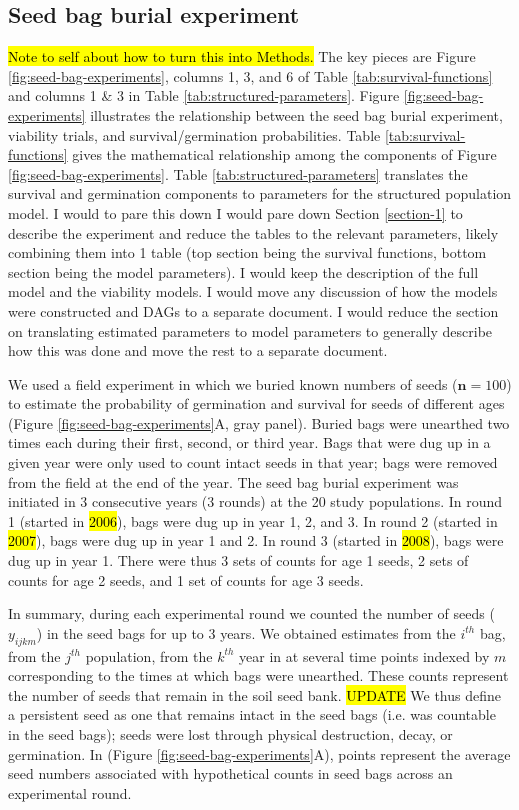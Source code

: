 \documentclass[12pt, oneside, titlepage]{article}   	%
\begin{document}
\subsection{Seed bag burial experiment}

\hl{Note to self about how to turn this into Methods.} The key pieces are Figure \ref{fig:seed-bag-experiments}, columns 1, 3, and 6 of Table \ref{tab:survival-functions} and columns 1 \& 3 in Table \ref{tab:structured-parameters}. Figure \ref{fig:seed-bag-experiments} illustrates the relationship between the seed bag burial experiment, viability trials, and survival/germination probabilities. Table \ref{tab:survival-functions} gives the mathematical relationship among the components of Figure \ref{fig:seed-bag-experiments}. Table \ref{tab:structured-parameters} translates the survival and germination components to parameters for the structured population model. I would to pare this down I would pare down Section \ref{section-1} to describe the experiment and reduce the tables to the relevant parameters, likely combining them into 1 table (top section being the survival functions, bottom section being the model parameters). I would keep the description of the full model and the viability models. I would move any discussion of how the models were constructed and DAGs to a separate document. I would reduce the section on translating estimated parameters to model parameters to generally describe how this was done and move the rest to a separate document. 

We used a field experiment in which we buried known numbers of seeds ($\bm{n}=100$) to estimate the probability of germination and survival for seeds of different ages (Figure \ref{fig:seed-bag-experiments}A, gray panel). Buried bags were unearthed two times each during their first, second, or third year. Bags that were dug up in a given year were only used to count intact seeds in that year; bags were removed from the field at the end of the year. The seed bag burial experiment was initiated in 3 consecutive years (3 rounds) at the 20 study populations. In round 1 (started in \hl{2006}), bags were dug up in year 1, 2, and 3. In round 2 (started in \hl{2007}), bags were dug up in year 1 and 2. In round 3 (started in \hl{2008}), bags were dug up in year 1. There were thus 3 sets of counts for age 1 seeds, 2 sets of counts for age 2 seeds, and 1 set of counts for age 3 seeds. 

In summary, during each experimental round we counted the number of seeds ($y_{ijkm}$) in the seed bags for up to 3 years. We obtained estimates from the $i^{th}$ bag, from the $j^{th}$ population, from the $k^{th}$ year in at several time points indexed by $m$ corresponding to the times at which bags were unearthed. These counts represent the number of seeds that remain in the soil seed bank. \hl{UPDATE} We thus define a persistent seed as one that remains intact in the seed bags (i.e. was countable in the seed bags); seeds were lost through physical destruction, decay, or germination. In (Figure \ref{fig:seed-bag-experiments}A), points represent the average seed numbers associated with hypothetical counts in seed bags across an experimental round.
\end{document}
